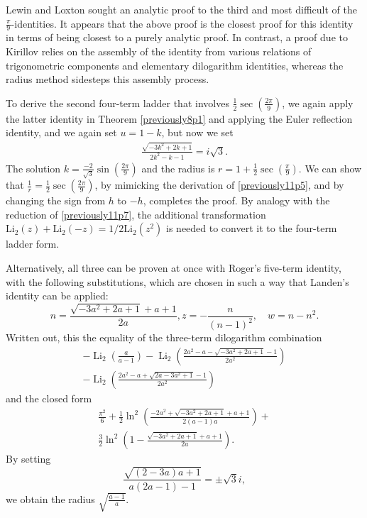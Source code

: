 \documentclass[12pt]{article}
\begin{document}
 Lewin and Loxton sought an analytic proof to the third and most difficult of the $\frac{\pi}{9}$-identities. It appears that the 
 above proof is the closest proof for this identity in terms of being closest to a purely analytic proof. In contrast, a proof due to Kirillov 
 \cite{Kirillov1995} relies on the assembly of the identity from various relations of trigonometric components and elementary 
 dilogarithm identities, whereas the radius method sidesteps this assembly process. 

 To derive the second four-term ladder that involves $\frac{1}{2} \sec(\frac{2\pi}{9})$, we again apply the latter identity in Theorem 
 \ref{previously8p1} and applying the Euler reflection identity, and we again set $u = 1 -k$, but now we set 
\begin{equation*}
\begin{aligned}
\frac{\sqrt{-3 k^2 + 2 k + 1}}{2 k^2 - k - 1} = i \sqrt{3}. 
\end{aligned}
\end{equation*}
 The solution $k=\frac{-2}{\sqrt{3}} \sin\left(\frac{2\pi}{9}\right)$ and the radius is $r=1+\frac{1}{2} \sec\left(\frac{\pi}{9}\right)$. We can 
 show that $\frac{1}{r} = \frac{1}{2} \sec\left(\frac{2\pi}{9}\right)$, by mimicking the derivation of \eqref{previously11p5}, and by 
 changing the sign from $h$ to $-h$, completes the proof. By analogy with the reduction of \eqref{previously11p7}, the additional 
 transformation $\operatorname{Li_2}(z) + \operatorname{Li_2}(-z)=1/2\operatorname{Li_2}(z^2)$ is needed to convert it to the 
 four-term ladder form. 

 Alternatively, all three can be proven at once with Roger's five-term identity, with the following substitutions, which are chosen 
 in such a way that Landen's identity can be applied: 
\begin{equation*}
 n = \frac{\sqrt{-3a^2 + 2a + 1} + a + 1}{2a},z = -\frac{n}{(n - 1)^2}, \quad w = n - n^2. 
\end{equation*}
 Written out, this the equality of the three-term dilogarithm combination 
\begin{multline*}
 - \operatorname{Li}_2 \left( \frac{a}{a - 1} \right) 
 - \operatorname{Li}_2 \left( \frac{2a^2 - a - \sqrt{-3a^2 + 2a + 1} - 1}{2a^2} \right) \\ 
 - \operatorname{Li}_2 \left( \frac{2a^2 - a + \sqrt{2a - 3a^2 + 1} - 1}{2a^2} \right) 
\end{multline*}
 and the closed form 
\begin{multline*}
 \frac{\pi^2}{6} 
 + \frac{1}{2} \ln^2 \left( \frac{-2a^2 + \sqrt{-3a^2 + 2a + 1} + a + 1}{2(a - 1)a} \right) + \\ 
 \frac{3}{2} \ln^2 \left( 1 - \frac{\sqrt{-3a^2 + 2a + 1} + a + 1}{2a} \right). 
\end{multline*}
 By setting 
\begin{equation*}
 \frac{\sqrt{(2 - 3a)a + 1}}{a(2a - 1) - 1} = \pm\sqrt{3}i, 
\end{equation*}
 we obtain the radius $\sqrt{\frac{a - 1}{a}}$. 
\end{document}
